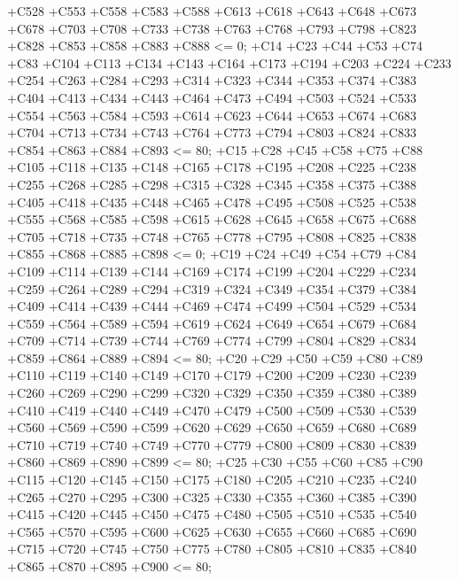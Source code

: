  +C528 +C553 +C558 +C583 +C588 +C613 +C618 +C643 +C648 +C673 +C678 +C703 +C708 +C733 +C738 +C763 +C768
 +C793 +C798 +C823 +C828 +C853 +C858 +C883 +C888 <= 0;
+C14 +C23 +C44 +C53 +C74 +C83 +C104 +C113 +C134 +C143 +C164 +C173 +C194 +C203 +C224 +C233 +C254 +C263
 +C284 +C293 +C314 +C323 +C344 +C353 +C374 +C383 +C404 +C413 +C434 +C443 +C464 +C473 +C494 +C503 +C524
 +C533 +C554 +C563 +C584 +C593 +C614 +C623 +C644 +C653 +C674 +C683 +C704 +C713 +C734 +C743 +C764 +C773
 +C794 +C803 +C824 +C833 +C854 +C863 +C884 +C893 <= 80;
+C15 +C28 +C45 +C58 +C75 +C88 +C105 +C118 +C135 +C148 +C165 +C178 +C195 +C208 +C225 +C238 +C255 +C268
 +C285 +C298 +C315 +C328 +C345 +C358 +C375 +C388 +C405 +C418 +C435 +C448 +C465 +C478 +C495 +C508 +C525
 +C538 +C555 +C568 +C585 +C598 +C615 +C628 +C645 +C658 +C675 +C688 +C705 +C718 +C735 +C748 +C765 +C778
 +C795 +C808 +C825 +C838 +C855 +C868 +C885 +C898 <= 0;
+C19 +C24 +C49 +C54 +C79 +C84 +C109 +C114 +C139 +C144 +C169 +C174 +C199 +C204 +C229 +C234 +C259 +C264
 +C289 +C294 +C319 +C324 +C349 +C354 +C379 +C384 +C409 +C414 +C439 +C444 +C469 +C474 +C499 +C504 +C529
 +C534 +C559 +C564 +C589 +C594 +C619 +C624 +C649 +C654 +C679 +C684 +C709 +C714 +C739 +C744 +C769 +C774
 +C799 +C804 +C829 +C834 +C859 +C864 +C889 +C894 <= 80;
+C20 +C29 +C50 +C59 +C80 +C89 +C110 +C119 +C140 +C149 +C170 +C179 +C200 +C209 +C230 +C239 +C260 +C269
 +C290 +C299 +C320 +C329 +C350 +C359 +C380 +C389 +C410 +C419 +C440 +C449 +C470 +C479 +C500 +C509 +C530
 +C539 +C560 +C569 +C590 +C599 +C620 +C629 +C650 +C659 +C680 +C689 +C710 +C719 +C740 +C749 +C770 +C779
 +C800 +C809 +C830 +C839 +C860 +C869 +C890 +C899 <= 80;
+C25 +C30 +C55 +C60 +C85 +C90 +C115 +C120 +C145 +C150 +C175 +C180 +C205 +C210 +C235 +C240 +C265 +C270
 +C295 +C300 +C325 +C330 +C355 +C360 +C385 +C390 +C415 +C420 +C445 +C450 +C475 +C480 +C505 +C510 +C535
 +C540 +C565 +C570 +C595 +C600 +C625 +C630 +C655 +C660 +C685 +C690 +C715 +C720 +C745 +C750 +C775 +C780
 +C805 +C810 +C835 +C840 +C865 +C870 +C895 +C900 <= 80; \\

